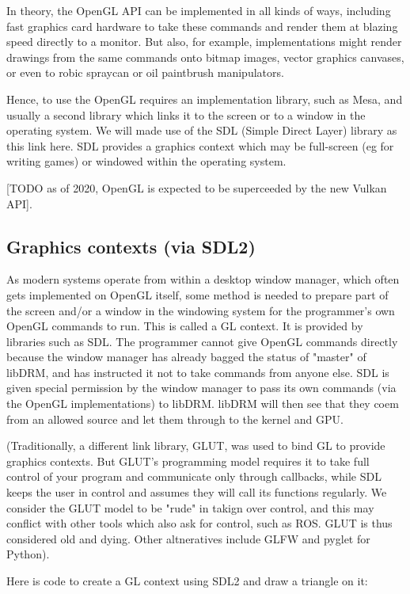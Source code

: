 \documentclass[oneside,english]{scrbook}
\begin{document}
In theory, the OpenGL API can be implemented in all kinds of ways, including fast graphics card hardware to take these commands and render them at blazing speed directly to a monitor. But also, for example, implementations might render drawings from the same commands onto bitmap images, vector graphics canvases, or even to robic spraycan or oil paintbrush manipulators.

Hence, to use the OpenGL requires an implementation library, such as Mesa, and usually a second library which links it to the screen or to a window in the operating system.   We will made use of the SDL (Simple Direct Layer) library as this link here.   SDL provides a graphics context which may be full-screen (eg for writing games) or windowed within the operating system.   

[TODO as of 2020, OpenGL is expected to be superceeded by the new Vulkan API].


\subsection{Graphics contexts (via SDL2)}

As modern systems operate from within a desktop window manager, which often gets implemented on OpenGL itself, some method is needed to prepare part of the screen and/or a window in the windowing system for the programmer's own OpenGL commands to run.  This is called a GL context.  It is provided by libraries such as SDL.   The programmer cannot give OpenGL commands directly because the window manager has already bagged the status of "master" of libDRM, and has instructed it not to take commands from anyone else.  SDL is given special permission by the window manager to pass its own commands (via the OpenGL implementations) to libDRM.  libDRM will then see that they coem from an allowed source and let them through to the kernel and GPU.


(Traditionally, a different link library, GLUT, was used to bind GL to provide graphics contexts. But GLUT's programming model requires it to take full control of your program and communicate only through callbacks, while SDL keeps the user in control and assumes they will call its functions regularly. We consider the GLUT model to be "rude" in takign over control, and this may conflict with other tools which also ask for control, such as ROS.  GLUT is thus considered old and dying.  Other altneratives include GLFW and pyglet for Python).

Here is code to create a GL context using SDL2 and draw a triangle on it:
\end{document}
